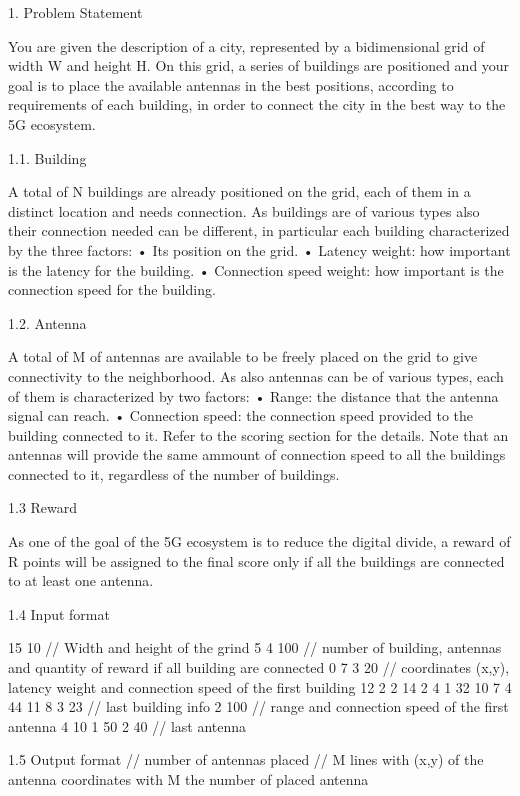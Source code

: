 1. Problem Statement

You are given the description of a city, represented by a bidimensional grid of
width W and height H.
On this grid, a series of buildings are positioned and your goal is to place
the available antennas in the best positions, according to requirements of each
building, in order to connect the city in the best way to the 5G ecosystem.

1.1. Building

A total of N buildings are already positioned on the grid, each of them in a
distinct location and needs connection.
As buildings are of various types also their connection needed can be different,
in particular each building characterized by the three factors:
• Its position on the grid.
• Latency weight: how important is the latency for the building.
• Connection speed weight: how important is the connection speed for
the building.

1.2. Antenna 

A total of M of antennas are available to be freely placed on the grid to give
connectivity to the neighborhood.
As also antennas can be of various types, each of them is characterized by two
factors:
• Range: the distance that the antenna signal can reach.
• Connection speed: the connection speed provided to the building connected to it.
Refer to the scoring section for the details.
Note that an antennas will provide the same ammount of connection speed to
all the buildings connected to it, regardless of the number of buildings.

1.3 Reward

As one of the goal of the 5G ecosystem is to reduce the digital divide, a
reward of R points will be assigned to the final score only if all the buildings
are connected to at least one antenna.

1.4 Input format

15 10  // Width and height of the grind
5 4 100 // number of building, antennas and quantity of reward if all building are connected
0 7 3 20 // coordinates (x,y),  latency weight and connection speed of the first building
12 2 2 14 
2 4 1 32 
10 7 4 44 
11 8 3 23 // last building info
2 100 // range and connection speed of the first antenna
4 10
1 50
2 40 // last antenna

1.5 Output format
// number of antennas placed
// M lines with (x,y) of the antenna coordinates with M the number of placed antenna